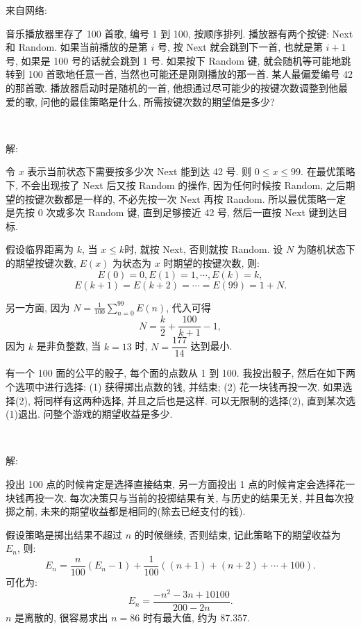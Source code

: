\newpage
\noindent 来自网络: 

音乐播放器里存了 100 首歌, 编号 1 到 100, 按顺序排列. 播放器有两个按键: Next 和 Random. 如果当前播放的是第 $i$ 号, 按 Next 就会跳到下一首, 也就是第 $i+1$ 号, 如果是 100 号的话就会跳到 1 号. 如果按下 Random 键, 就会随机等可能地跳转到 100 首歌地任意一首, 当然也可能还是刚刚播放的那一首. 某人最偏爱编号 42 的那首歌. 播放器启动时是随机的一首, 他想通过尽可能少的按键次数调整到他最爱的歌, 问他的最佳策略是什么, 所需按键次数的期望值是多少?

~

\noindent 解:

令 $x$ 表示当前状态下需要按多少次 Next 能到达 42 号. 则 $ 0\le x\le 99$. 在最优策略下, 不会出现按了 Next 后又按 Random 的操作, 因为任何时候按 Random, 之后期望的按键次数都是一样的, 不必先按一次 Next 再按 Random. 所以最优策略一定是先按 0 次或多次 Random 键, 直到足够接近 42 号, 然后一直按 Next 键到达目标.

假设临界距离为 $k$, 当 $x\le k$时, 就按 Next, 否则就按 Random. 设 $N$ 为随机状态下的期望按键次数, $E(x)$ 为状态为 $x$ 时期望的按键次数, 则:
\[E(0) = 0, E(1) = 1, \cdots, E(k) = k,\]
\[E(k+1) = E(k+2) = \cdots = E(99) = 1 + N .\]

另一方面, 因为 $\displaystyle N = \frac{1}{100}\sum_{n=0}^{99}{E(n)}$, 代入可得
\[ N = \frac{k}{2} + \frac{100}{k+1} - 1, \]
因为 $k$ 是非负整数, 当 $k=13$ 时, $N=\dfrac{177}{14}$ 达到最小.

\newpage

有一个 100 面的公平的骰子, 每个面的点数从 1 到 100. 我投出骰子, 然后在如下两个选项中进行选择: (1) 获得掷出点数的钱, 并结束; (2) 花一块钱再投一次. 如果选择(2), 将同样有这两种选择, 并且之后也是这样. 可以无限制的选择(2), 直到某次选(1)退出. 问整个游戏的期望收益是多少.

~

\noindent 解: 

投出 100 点的时候肯定是选择直接结束, 另一方面投出 1 点的时候肯定会选择花一块钱再投一次. 每次决策只与当前的投掷结果有关, 与历史的结果无关, 并且每次投掷之前, 未来的期望收益都是相同的(除去已经支付的钱).

假设策略是掷出结果不超过 $n$ 的时候继续, 否则结束, 记此策略下的期望收益为 $E_n$, 则:
\[ E_n = \frac{n}{100}(E_n - 1) + \frac{1}{100}((n+1) + (n+2) + \cdots + 100) .\]
可化为:
\[E_n = \frac{-n^2 - 3n + 10100}{200 - 2n}.\]
$n$ 是离散的, 很容易求出 $n = 86$ 时有最大值, 约为 $87.357$.


